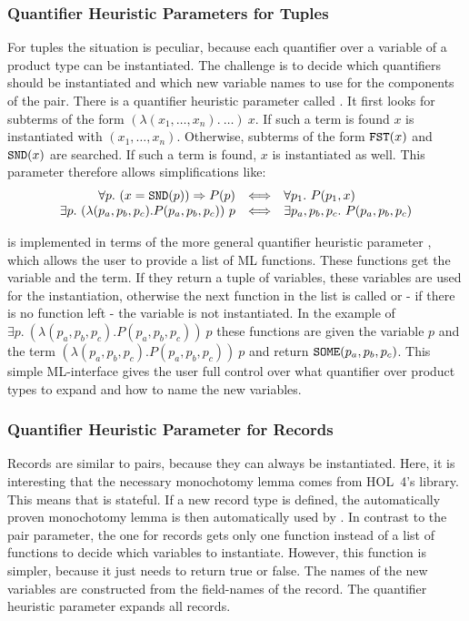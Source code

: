 \subsubsection{Quantifier Heuristic Parameters for Tuples}

For tuples the situation is peculiar, because each quantifier over a variable of a product type
can be instantiated. The challenge is to decide which quantifiers should be instantiated and
which new variable names to use for the components of the pair.
There is a quantifier heuristic parameter called . It first looks for
subterms of the form $(\lambda (x_1, \ldots, x_n).\ \ldots)\ x$. If such a term is found $x$ is instantiated with
$(x_1, \ldots, x_n)$. Otherwise, subterms of the form $\holtxt{FST}(x)$ and $\holtxt{SND}(x)$ are searched. If such a term
is found, $x$ is instantiated as well. This parameter therefore allows simplifications like:
%
\[\begin{array}{r@{\quad \Longleftrightarrow \quad}l}
\forall p.\ (x = \holtxt{SND}(p)) \Rightarrow P(p)& \forall p_1.\ P(p_1, x) \\
\exists p.\ (\lambda (p_a, p_b, p_c). P(p_a, p_b, p_c))\ p & \exists p_a, p_b, p_c.\ P(p_a, p_b, p_c)
\end{array}\]

 is implemented in terms of the more general
quantifier heuristic parameter , which allows the
user to provide a list of ML functions. These functions get the
variable and the term. If they return a tuple of variables, these
variables are used for the instantiation, otherwise the next function
in the list is called or - if there is no function left - the variable
is not instantiated. In the example of $\exists p.\ (\lambda (p_a,
p_b, p_c). P(p_a, p_b, p_c))\ p$ these functions are given the
variable $p$ and the term $(\lambda (p_a, p_b, p_c). P(p_a, p_b,
p_c))\ p$ and return $\holtxt{SOME} (p_a, p_b, p_c)$.  This simple
ML-interface gives the user full control over what quantifier over
product types to expand and how to name the new variables.

\subsubsection{Quantifier Heuristic Parameter for Records}

Records are similar to pairs, because they can always be instantiated. Here, it is interesting that the necessary
monochotomy lemma comes from HOL~4's  library. This means that  is stateful.
If a new record type is defined, the automatically proven monochotomy lemma is then automatically used
by . In contrast to the pair parameter, the one for records gets only one function instead of a
list of functions to decide which variables to instantiate. However, this function is simpler, because it just needs
to return true or false. The names of the new variables are constructed from the field-names of the record.
The quantifier heuristic parameter  expands all records.

